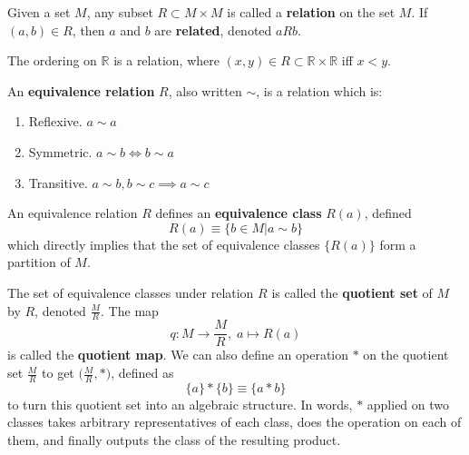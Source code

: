 \documentclass{article}
\begin{document}
    \begin{definition}[Relation]
      Given a set $M$, any subset $R \subset M \times M$ is called a \textbf{relation} on the set $M$. If $(a, b) \in R$, then $a$ and $b$ are \textbf{related}, denoted $a R b$. 
    \end{definition}

    \begin{example}[Ordering]
      The ordering on $\mathbb{R}$ is a relation, where $(x, y) \in R \subset \mathbb{R} \times \mathbb{R}$ iff $x < y$. 
    \end{example}

    \begin{definition}
      An \textbf{equivalence relation} $R$, also written $\sim$, is a relation which is:
      \begin{enumerate}
        \item Reflexive. $a \sim a$ 
        \item Symmetric. $a \sim b \iff b \sim a$ 
        \item Transitive. $a \sim b, b \sim c \implies a \sim c$ 
      \end{enumerate}
      An equivalence relation $R$ defines an \textbf{equivalence class} $R(a)$, defined 
      \begin{equation}
        R(a) \equiv \{ b \in M | a \sim b \} 
      \end{equation}
      which directly implies that the set of equivalence classes $\{R(a)\}$ form a partition of $M$. 
    \end{definition}

    \begin{definition}
      The set of equivalence classes under relation $R$ is called the \textbf{quotient set} of $M$ by $R$, denoted $\frac{M}{R}$. The map 
      \begin{equation}
        q: M \longrightarrow \frac{M}{R}, \; a \mapsto R(a)
      \end{equation}
      is called the \textbf{quotient map}. We can also define an operation $*$ on the quotient set $\frac{M}{R}$ to get $\big( \frac{M}{R}, * \big)$, defined as
      \begin{equation}
        \{a \} * \{ b \} \equiv \{ a * b \}
      \end{equation}
      to turn this quotient set into an algebraic structure. In words, $*$ applied on two classes takes arbitrary representatives of each class, does the operation on each of them, and finally outputs the class of the resulting product. 
    \end{definition}
\end{document}
